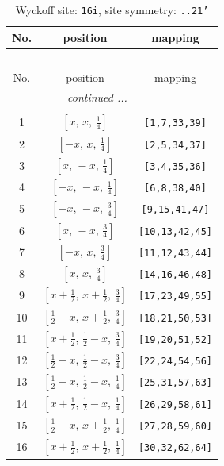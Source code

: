 \documentclass[fleqn,8pt]{jsarticle}
\begin{document}
\begin{longtable}{ccc}
\caption{Wyckoff site: {\tt 16i}, site symmetry: {\tt ..21'}}
 \\
 \hline \hline
No. & position & mapping \\ \hline \endfirsthead

\multicolumn{2}{l}{\tablename\ \thetable{}} \\
 \hline \hline
No. & position & mapping \\ \hline \endhead

 \hline \hline
\multicolumn{2}{r}{\footnotesize\it continued ...} \\ \endfoot

 \hline \hline
\multicolumn{2}{r}{} \\ \endlastfoot

1 & $\left[ x,\, x,\, \frac{1}{4} \right]$ & {\tt [1,7,33,39]} \\ \hline
2 & $\left[ - x,\, x,\, \frac{1}{4} \right]$ & {\tt [2,5,34,37]} \\ \hline
3 & $\left[ x,\, - x,\, \frac{1}{4} \right]$ & {\tt [3,4,35,36]} \\ \hline
4 & $\left[ - x,\, - x,\, \frac{1}{4} \right]$ & {\tt [6,8,38,40]} \\ \hline
5 & $\left[ - x,\, - x,\, \frac{3}{4} \right]$ & {\tt [9,15,41,47]} \\ \hline
6 & $\left[ x,\, - x,\, \frac{3}{4} \right]$ & {\tt [10,13,42,45]} \\ \hline
7 & $\left[ - x,\, x,\, \frac{3}{4} \right]$ & {\tt [11,12,43,44]} \\ \hline
8 & $\left[ x,\, x,\, \frac{3}{4} \right]$ & {\tt [14,16,46,48]} \\ \hline
9 & $\left[ x + \frac{1}{2},\, x + \frac{1}{2},\, \frac{3}{4} \right]$ & {\tt [17,23,49,55]} \\ \hline
10 & $\left[ \frac{1}{2} - x,\, x + \frac{1}{2},\, \frac{3}{4} \right]$ & {\tt [18,21,50,53]} \\ \hline
11 & $\left[ x + \frac{1}{2},\, \frac{1}{2} - x,\, \frac{3}{4} \right]$ & {\tt [19,20,51,52]} \\ \hline
12 & $\left[ \frac{1}{2} - x,\, \frac{1}{2} - x,\, \frac{3}{4} \right]$ & {\tt [22,24,54,56]} \\ \hline
13 & $\left[ \frac{1}{2} - x,\, \frac{1}{2} - x,\, \frac{1}{4} \right]$ & {\tt [25,31,57,63]} \\ \hline
14 & $\left[ x + \frac{1}{2},\, \frac{1}{2} - x,\, \frac{1}{4} \right]$ & {\tt [26,29,58,61]} \\ \hline
15 & $\left[ \frac{1}{2} - x,\, x + \frac{1}{2},\, \frac{1}{4} \right]$ & {\tt [27,28,59,60]} \\ \hline
16 & $\left[ x + \frac{1}{2},\, x + \frac{1}{2},\, \frac{1}{4} \right]$ & {\tt [30,32,62,64]} \\
\end{longtable}
\end{document}
